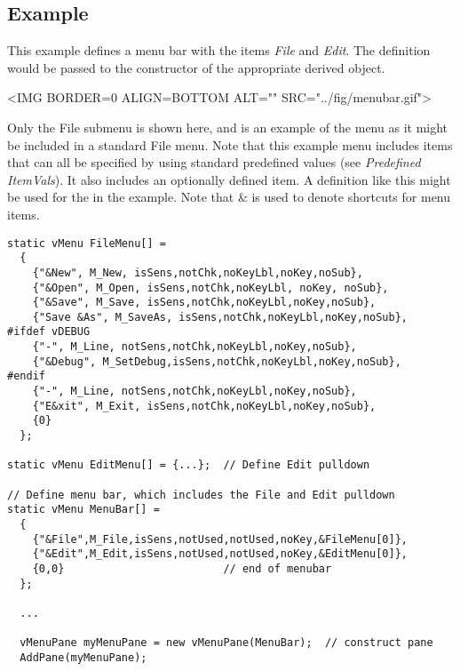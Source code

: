 \subsection* {Example}

This example defines a menu bar with the items \emph{File} and
\emph{Edit}. The  definition would be passed to the
constructor of the appropriate  derived object.

\vspace{.1in}
\small

\begin{rawhtml}
<IMG BORDER=0 ALIGN=BOTTOM ALT="" SRC="../fig/menubar.gif">
\end{rawhtml}

\begin{latexonly}

\end{latexonly}

\normalfont\normalsize
\vspace{.1in}

Only the File submenu is shown here, and is an example of the
menu as it might be included in a standard File menu. Note that this
example menu includes items that can all be specified by using
standard predefined values (see \emph{Predefined ItemVals}). It
also includes an optionally defined  item. A
definition like this might be used for the  in
the  example. Note that \& is used to denote shortcuts
for menu items.

\footnotesize
\begin{verbatim}
static vMenu FileMenu[] =
  {
    {"&New", M_New, isSens,notChk,noKeyLbl,noKey,noSub},
    {"&Open", M_Open, isSens,notChk,noKeyLbl, noKey, noSub},
    {"&Save", M_Save, isSens,notChk,noKeyLbl,noKey,noSub},
    {"Save &As", M_SaveAs, isSens,notChk,noKeyLbl,noKey,noSub},
#ifdef vDEBUG
    {"-", M_Line, notSens,notChk,noKeyLbl,noKey,noSub},
    {"&Debug", M_SetDebug,isSens,notChk,noKeyLbl,noKey,noSub},
#endif
    {"-", M_Line, notSens,notChk,noKeyLbl,noKey,noSub},
    {"E&xit", M_Exit, isSens,notChk,noKeyLbl,noKey,noSub},
    {0}
  };

static vMenu EditMenu[] = {...};  // Define Edit pulldown

// Define menu bar, which includes the File and Edit pulldown
static vMenu MenuBar[] =
  {
    {"&File",M_File,isSens,notUsed,notUsed,noKey,&FileMenu[0]},
    {"&Edit",M_Edit,isSens,notUsed,notUsed,noKey,&EditMenu[0]},
    {0,0}                         // end of menubar
  };

  ...

  vMenuPane myMenuPane = new vMenuPane(MenuBar);  // construct pane
  AddPane(myMenuPane);
\end{verbatim}
\normalfont\normalsize

